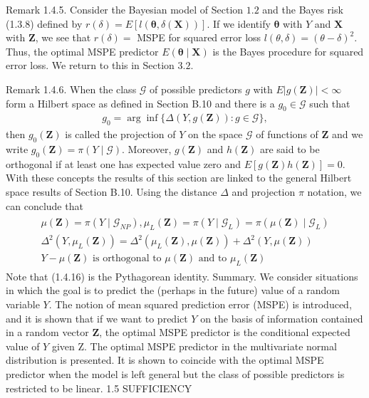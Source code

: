 \documentclass{article}
\begin{document}
Remark 1.4.5. Consider the Bayesian model of Section $1.2$ and the Bayes risk (1.3.8) defined by $r(\delta)=E[l(\boldsymbol{\theta}, \delta(\mathbf{X}))]$. If we identify $\boldsymbol{\theta}$ with $Y$ and $\mathbf{X}$ with $\mathbf{Z}$, we see that $r(\delta)=$ MSPE for squared error loss $l(\theta, \delta)=(\theta-\delta)^{2}$. Thus, the optimal MSPE predictor $E(\boldsymbol{\theta} \mid \mathbf{X})$ is the Bayes procedure for squared error loss. We return to this in Section $3.2$.

Remark 1.4.6. When the class $\mathcal{G}$ of possible predictors $g$ with $E|g(\mathbf{Z})|<\infty$ form a Hilbert space as defined in Section B.10 and there is a $g_{0} \in \mathcal{G}$ such that
\begin{align*}
g_{0}=\arg \inf \{\Delta(Y, g(\mathbf{Z})): g \in \mathcal{G}\},
\end{align*}
then $g_{0}(\mathbf{Z})$ is called the projection of $Y$ on the space $\mathcal{G}$ of functions of $\mathbf{Z}$ and we write $g_{0}(\mathbf{Z})=\pi(Y \mid \mathcal{G})$. Moreover, $g(\mathbf{Z})$ and $h(\mathbf{Z})$ are said to be orthogonal if at least one has expected value zero and $E[g(\mathbf{Z}) h(\mathbf{Z})]=0$. With these concepts the results of this section are linked to the general Hilbert space results of Section B.10. Using the distance $\Delta$ and projection $\pi$ notation, we can conclude that
\begin{align*}
\begin{gathered}
\mu(\mathbf{Z})=\pi\left(Y \mid \mathcal{G}_{N P}\right), \mu_{L}(\mathbf{Z})=\pi\left(Y \mid \mathcal{G}_{L}\right)=\pi\left(\mu(\mathbf{Z}) \mid \mathcal{G}_{L}\right) \\
\Delta^{2}\left(Y, \mu_{L}(\mathbf{Z})\right)=\Delta^{2}\left(\mu_{L}(\mathbf{Z}), \mu(\mathbf{Z})\right)+\Delta^{2}(Y, \mu(\mathbf{Z})) \\
Y-\mu(\mathbf{Z}) \text { is orthogonal to } \mu(\mathbf{Z}) \text { and to } \mu_{L}(\mathbf{Z})
\end{gathered}
\end{align*}
Note that (1.4.16) is the Pythagorean identity.
Summary. We consider situations in which the goal is to predict the (perhaps in the future) value of a random variable $Y$. The notion of mean squared prediction error (MSPE) is introduced, and it is shown that if we want to predict $Y$ on the basis of information contained in a random vector $\mathbf{Z}$, the optimal MSPE predictor is the conditional expected value of $Y$ given Z. The optimal MSPE predictor in the multivariate normal distribution is presented. It is shown to coincide with the optimal MSPE predictor when the model is left general but the class of possible predictors is restricted to be linear.
1.5 SUFFICIENCY
\end{document}
